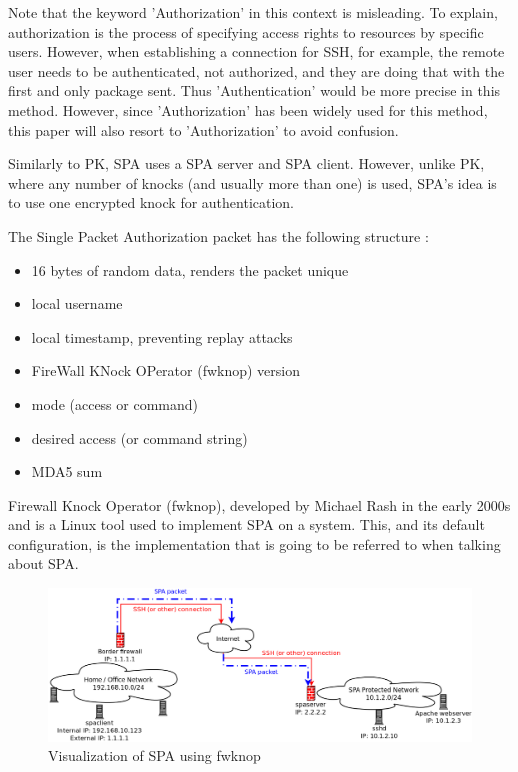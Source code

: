Note that the keyword 'Authorization' in this context is misleading. To explain, authorization is the process of specifying access rights to resources by specific users.  However, when establishing a connection for SSH, for example, the remote user needs to be authenticated, not authorized, and they are doing that with the first and only package sent.  Thus 'Authentication' would be more precise in this method.  However, since 'Authorization' has been widely used for this method, this paper will also resort to 'Authorization' to avoid confusion.\\\par

Similarly to PK, SPA uses a SPA server and SPA client.  However, unlike PK, where any number of knocks (and usually more than one) is used, SPA's idea is to use one encrypted knock for authentication.

The Single Packet Authorization packet has the following structure \cite{SPAwiki}:
\begin{itemize}
    \item 16 bytes of random data, renders the packet unique
    \item local username
    \item local timestamp, preventing replay attacks
    \item FireWall KNock OPerator (fwknop) version
    \item mode (access or command)
    \item desired access (or command string)
    \item MDA5 sum
\end{itemize}

Firewall Knock Operator (fwknop), developed by Michael Rash in the early 2000s \cite{SPAwiki} and is a Linux tool used to implement SPA on a system.  This, and its default configuration, is the implementation that is going to be referred to when talking about SPA.\par

\begin{figure}[h!]
    \centering
    \includegraphics[width=\textwidth]{figures/fwknop_SPA.png}
    \caption{Visualization of SPA using fwknop \cite{spaimage}}
    \label{fig:fwknop_SPA}
\end{figure}

